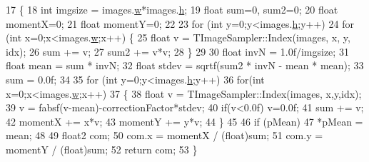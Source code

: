 \begin{DoxyCode}
17 \{
18     \textcolor{keywordtype}{int} imgsize = images.\hyperlink{structcuda_image_list_a1fe4adbbd48678e07c6b58f50dbe8528}{w}*images.\hyperlink{structcuda_image_list_a90c8a96b431b4faa4759987f44d06123}{h};
19     \textcolor{keywordtype}{float} sum=0, sum2=0;
20     \textcolor{keywordtype}{float} momentX=0;
21     \textcolor{keywordtype}{float} momentY=0;
22 
23     \textcolor{keywordflow}{for} (\textcolor{keywordtype}{int} y=0;y<images.\hyperlink{structcuda_image_list_a90c8a96b431b4faa4759987f44d06123}{h};y++)
24         \textcolor{keywordflow}{for} (\textcolor{keywordtype}{int} x=0;x<images.\hyperlink{structcuda_image_list_a1fe4adbbd48678e07c6b58f50dbe8528}{w};x++) \{
25             \textcolor{keywordtype}{float} v = TImageSampler::Index(images, x, y, idx);
26             sum += v;
27             sum2 += v*v;
28         \}
29 
30     \textcolor{keywordtype}{float} invN = 1.0f/imgsize;
31     \textcolor{keywordtype}{float} mean = sum * invN;
32     \textcolor{keywordtype}{float} stdev = sqrtf(sum2 * invN - mean * mean);
33     sum = 0.0f;
34 
35     \textcolor{keywordflow}{for} (\textcolor{keywordtype}{int} y=0;y<images.\hyperlink{structcuda_image_list_a90c8a96b431b4faa4759987f44d06123}{h};y++)
36         \textcolor{keywordflow}{for}(\textcolor{keywordtype}{int} x=0;x<images.\hyperlink{structcuda_image_list_a1fe4adbbd48678e07c6b58f50dbe8528}{w};x++)
37         \{
38             \textcolor{keywordtype}{float} v = TImageSampler::Index(images, x,y,idx);
39             v = fabsf(v-mean)-correctionFactor*stdev;
40             \textcolor{keywordflow}{if}(v<0.0f) v=0.0f;
41             sum += v;
42             momentX += x*v;
43             momentY += y*v;
44         \}
45 
46     \textcolor{keywordflow}{if} (pMean)
47         *pMean = mean;
48 
49     float2 com;
50     com.x = momentX / (float)sum;
51     com.y = momentY / (float)sum;
52     \textcolor{keywordflow}{return} com;
53 \}
\end{DoxyCode}
